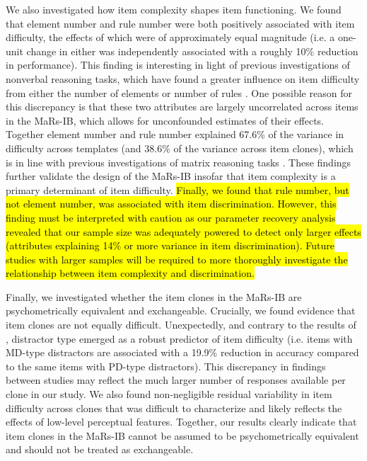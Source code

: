 \documentclass[a4paper,man,natbib,noextraspace]{apa6}
\begin{document}
We also investigated how item complexity shapes item functioning. We found that element number and rule number were both positively associated with item difficulty, the effects of which were of approximately equal magnitude (i.e. a one-unit change in either was independently associated with a roughly 10\% reduction in performance). This finding is interesting in light of previous investigations of nonverbal reasoning tasks, which have found a greater influence on item difficulty from either the number of elements \citep{bethell1984adaptive} or number of rules \citep{mulholland1980components}. One possible reason for this discrepancy is that these two attributes are largely uncorrelated across items in the MaRs-IB, which allows for unconfounded estimates of their effects. Together element number and rule number explained 67.6\% of the variance in difficulty across templates (and 38.6\% of the variance across item clones), which is in line with previous investigations of matrix reasoning tasks \citep{carpenter1990one, matzen1994error}. These findings further validate the design of the MaRs-IB insofar that item complexity is a primary determinant of item difficulty. \hl{Finally, we found that rule number, but not element number, was associated with item discrimination. However, this finding must be interpreted with caution as our parameter recovery analysis revealed that our sample size was adequately powered to detect only larger effects (attributes explaining 14\% or more variance in item discrimination). Future studies with larger samples will be required to more thoroughly investigate the relationship between item complexity and discrimination.}

Finally, we investigated whether the item clones in the MaRs-IB are psychometrically equivalent and exchangeable. Crucially, we found evidence that item clones are not equally difficult. Unexpectedly, and contrary to the results of \cite{chierchia2019matrix}, distractor type emerged as a robust predictor of item difficulty (i.e. items with MD-type distractors are associated with a 19.9\% reduction in accuracy compared to the same items with PD-type distractors). This discrepancy in findings between studies may reflect the much larger number of responses available per clone in our study. We also found non-negligible residual variability in item difficulty across clones that was difficult to characterize and likely reflects the effects of low-level perceptual features. Together, our results clearly indicate that item clones in the MaRs-IB cannot be assumed to be psychometrically equivalent and should not be treated as exchangeable.
\end{document}
